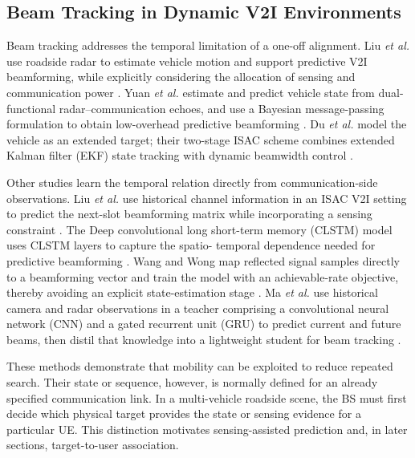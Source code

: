 \subsection{Beam Tracking in Dynamic V2I Environments}
\label{subsec:background-dynamic-beam-tracking}

Beam tracking addresses the temporal limitation of a one-off alignment.  Liu
\emph{et al.} use roadside radar to estimate vehicle motion and support
predictive V2I beamforming, while explicitly considering the allocation of
sensing and communication power \cite{liu2020radarassistedpredictivebeamformingvehicular}.
Yuan \emph{et al.} estimate and predict vehicle state from dual-functional
radar--communication echoes, and use a Bayesian message-passing formulation to
obtain low-overhead predictive beamforming \cite{yuan2020bayesianpredictivebeamformingvehicular}.
Du \emph{et al.} model the vehicle as an extended target; their two-stage ISAC
scheme combines extended Kalman filter (EKF) state tracking with dynamic beamwidth control
\cite{du2021integratedsensingcommunicationsv2i}.

Other studies learn the temporal relation directly from communication-side
observations.  Liu \emph{et al.} use historical channel information in an
ISAC V2I setting to predict the next-slot beamforming matrix while incorporating
a sensing constraint \cite{liu2022learningbasedpredictivebeamformingintegrated}.
The Deep convolutional long short-term memory (CLSTM) model uses CLSTM layers to capture the spatio-
temporal dependence needed for predictive beamforming
\cite{liu2022deepclstmpredictivebeamforming}.  Wang and Wong map reflected
signal samples directly to a beamforming vector and train the model with an
achievable-rate objective, thereby avoiding an explicit state-estimation stage
\cite{Wang_2023}.  Ma \emph{et al.} use historical camera and radar observations
in a teacher comprising a convolutional neural network (CNN) and a gated recurrent
unit (GRU) to predict current and future beams, then distil that
knowledge into a lightweight student for beam tracking
\cite{ma2026knowledgedistillationlightweightmultimodal}.

These methods demonstrate that mobility can be exploited to reduce repeated
search.  Their state or sequence, however, is normally defined for an already
specified communication link.  In a multi-vehicle roadside scene, the BS must
first decide which physical target provides the state or sensing evidence for a
particular UE.  This distinction motivates sensing-assisted prediction and, in
later sections, target-to-user association.

